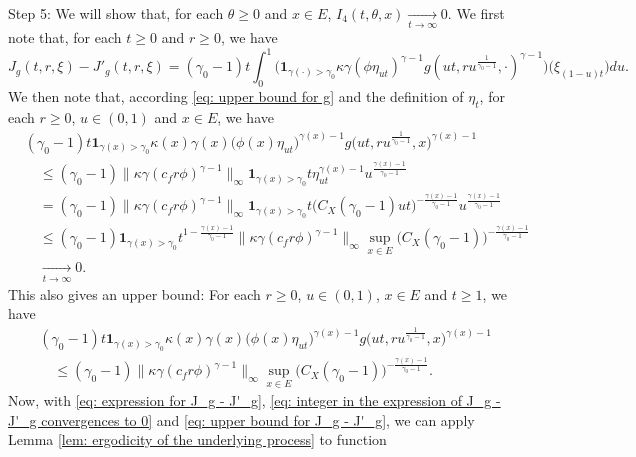 \documentclass[12pt, a4paper]{amsart}
\theoremstyle{definition}
\numberwithin{equation}{section}
\begin{document}
	Step 5: We will show that, for each $\theta \geq 0$ and $x\in E$, $I_4(t,\theta,x) \xrightarrow[t\to \infty]{} 0$. 
	We first note that, for each $t\geq 0$ and $r\geq 0$, we have 
\[\label{eq: expression for J_g - J'_g}
	J_g(t,r,\xi) - J'_g(t,r,\xi) 
	= (\gamma_0 - 1)t\int_0^1 \big( \mathbf 1_{\gamma(\cdot )> \gamma_0}  \kappa\gamma (   \phi \eta_{ut}   )^{\gamma - 1} g (ut,ru^{\frac{1}{\gamma_0 - 1}},\cdot )^{\gamma-1}  \big) \big(  \xi_{(1-u)t}  \big) du.
\]
	We then note that, according \eqref{eq: upper bound for g} and the definition of $\eta_t$, for each $r\geq 0$, $u\in (0,1)$ and $x\in E$, we have
\[\label{eq: integer in the expression of J_g - J'_g convergences to 0}\begin{split}
	&(\gamma_0 - 1)t  \mathbf 1_{\gamma(x)> \gamma_0}  \kappa(x)\gamma(x) \big(   \phi(x) \eta_{ut}   \big)^{\gamma(x) - 1} g \big(ut,ru^{\frac{1}{\gamma_0 - 1}},x \big)^{\gamma(x)-1}  
	\\&\quad \leq (\gamma_0 - 1) \big\| \kappa \gamma (c_f r\phi)^{\gamma - 1}\big\|_\infty \mathbf 1_{\gamma(x) > \gamma_0} t \eta_{ut}^{\gamma(x) - 1} u^{\frac{\gamma(x) - 1}{\gamma_0 - 1}}
	\\&\quad = (\gamma_0 - 1) \big\| \kappa \gamma (c_f r\phi)^{\gamma - 1}\big\|_\infty \mathbf 1_{\gamma(x) > \gamma_0} t \big( C_X(\gamma_0 - 1) ut\big)^{-\frac{\gamma(x) - 1}{\gamma_0 - 1}} u^{\frac{\gamma(x) - 1}{\gamma_0 - 1}}
	\\&\quad \leq (\gamma_0 - 1) \mathbf 1_{\gamma(x) > \gamma_0} t^{1-\frac{\gamma(x) - 1}{\gamma_0 - 1}}\big\| \kappa \gamma (c_f r\phi)^{\gamma - 1}\big\|_\infty \sup_{x\in E} \big( C_X(\gamma_0 - 1) \big)^{-\frac{\gamma(x) - 1}{\gamma_0 - 1}}
	\\&\quad \xrightarrow[t\to \infty]{} 0.
\end{split}\]
	This also gives an upper bound: For each $r\geq 0$, $u \in (0,1)$, $x\in E$ and $t\geq 1$, we have
\[\label{eq: upper bound for the integrator of J_g - J'_g} \begin{split}
	&(\gamma_0 - 1)t  \mathbf 1_{\gamma(x)> \gamma_0}  \kappa(x)\gamma(x) \big(   \phi(x) \eta_{ut}   \big)^{\gamma(x) - 1} g \big(ut,ru^{\frac{1}{\gamma_0 - 1}},x \big)^{\gamma(x)-1}  
	\\&\quad \leq (\gamma_0 - 1) \big\| \kappa \gamma (c_f r\phi)^{\gamma - 1}\big\|_\infty \sup_{x\in E} \big( C_X(\gamma_0 - 1) \big)^{-\frac{\gamma(x) - 1}{\gamma_0 - 1}}.
\end{split}\]
	Now, with \eqref{eq: expression for J_g - J'_g}, \eqref{eq: integer in the expression of J_g - J'_g convergences to 0} and \eqref{eq: upper bound for J_g - J'_g}, we can apply Lemma \ref{lem: ergodicity of the underlying process} to function
\end{document}
